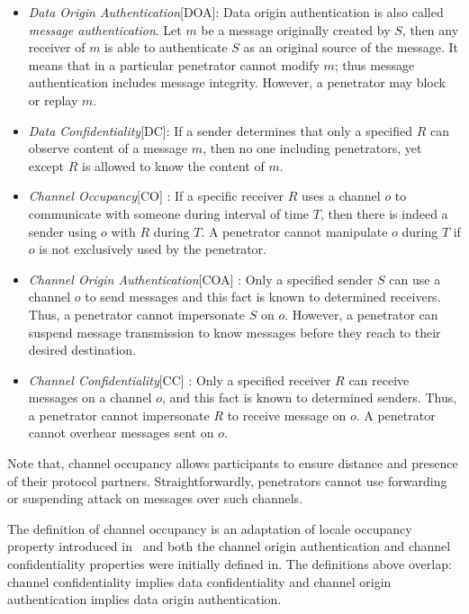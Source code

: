 \begin{itemize}
\item \emph{Data Origin Authentication}[DOA]: Data origin authentication is also called \emph{message authentication}. Let $m$ be a message originally created by $S$, then any receiver of $m$ is able to authenticate $S$ as an original source of the message. It means that in a particular penetrator cannot modify $m$; thus message authentication includes message integrity. However, a penetrator may block or replay $m$. 
\item \emph{Data Confidentiality}[DC]: If a sender determines that only a specified $R$ can observe content of a message $m$, then no one including penetrators, yet except $R$ is allowed to know the content of $m$.
\item \emph{Channel Occupancy}[CO] : If a specific receiver $R$ uses a channel $o$ to communicate with someone during interval of time $T$, then there is indeed a sender using $o$ with $R$ during $T$. A penetrator cannot manipulate $o$ during $T$ if $o$ is not exclusively used by the penetrator. 
\item \emph{Channel Origin Authentication}[COA] \cite{Mausch94}: Only a specified sender $S$ can use a channel $o$ to send messages and this fact is known to determined receivers. Thus, a penetrator cannot impersonate $S$ on $o$. However, a penetrator can suspend message transmission to know messages before they reach to their desired destination. 
\item \emph{Channel Confidentiality}[CC] \cite{Mausch94}: Only a specified receiver $R$ can receive messages on a channel $o$, and this fact is known to determined senders. Thus, a penetrator cannot impersonate $R$ to receive message on $o$. A penetrator cannot overhear messages sent on $o$.
\end{itemize} 

Note that, channel occupancy allows participants to ensure distance and presence of their protocol partners. Straightforwardly, penetrators cannot use forwarding or suspending attack on messages over such channels.

The definition of channel occupancy is an adaptation of locale occupancy property introduced in~\cite{Thayer:2010aa} and both the channel origin authentication and channel confidentiality properties were initially defined in\cite{Mausch94}. The definitions above overlap: channel confidentiality implies data confidentiality and channel origin authentication implies data origin authentication.

